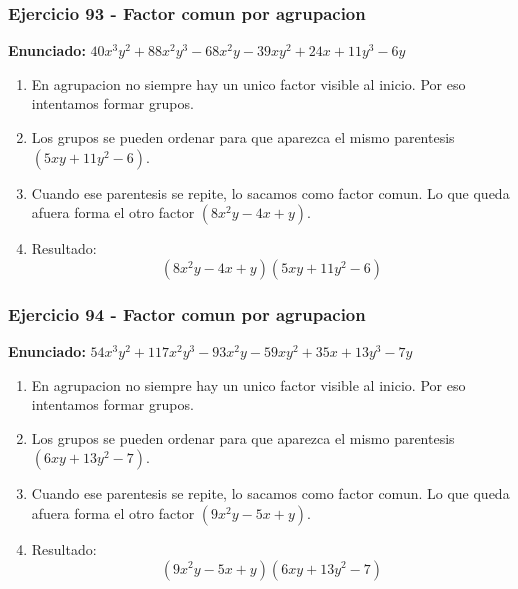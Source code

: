 \documentclass[11pt,a4paper]{article}
\begin{document}
\subsubsection*{Ejercicio 93 - Factor comun por agrupacion}
\textbf{Enunciado:} $ 40 x^{3} y^{2} + 88 x^{2} y^{3} - 68 x^{2} y - 39 x y^{2} + 24 x + 11 y^{3} - 6 y $\par
\begin{enumerate}[leftmargin=2em]
\item En agrupacion no siempre hay un unico factor visible al inicio. Por eso intentamos formar grupos.
\item Los grupos se pueden ordenar para que aparezca el mismo parentesis \((5 x y + 11 y^{2} - 6)\).
\item Cuando ese parentesis se repite, lo sacamos como factor comun. Lo que queda afuera forma el otro factor \((8 x^{2} y - 4 x + y)\).
\item Resultado: \[\boxed{\left(8 x^{2} y - 4 x + y\right)\left(5 x y + 11 y^{2} - 6\right)}\]
\end{enumerate}

\vspace{0.2cm}
\subsubsection*{Ejercicio 94 - Factor comun por agrupacion}
\textbf{Enunciado:} $ 54 x^{3} y^{2} + 117 x^{2} y^{3} - 93 x^{2} y - 59 x y^{2} + 35 x + 13 y^{3} - 7 y $\par
\begin{enumerate}[leftmargin=2em]
\item En agrupacion no siempre hay un unico factor visible al inicio. Por eso intentamos formar grupos.
\item Los grupos se pueden ordenar para que aparezca el mismo parentesis \((6 x y + 13 y^{2} - 7)\).
\item Cuando ese parentesis se repite, lo sacamos como factor comun. Lo que queda afuera forma el otro factor \((9 x^{2} y - 5 x + y)\).
\item Resultado: \[\boxed{\left(9 x^{2} y - 5 x + y\right)\left(6 x y + 13 y^{2} - 7\right)}\]
\end{enumerate}

\vspace{0.2cm}
\end{document}
